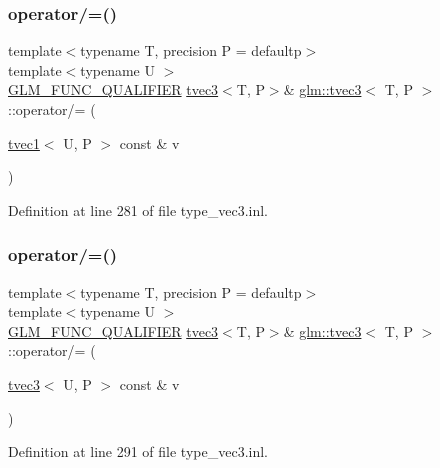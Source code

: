 \subsubsection{\texorpdfstring{operator/=()}{operator/=()}\hspace{0.1cm}{\footnotesize\ttfamily [5/6]}}
{\footnotesize\ttfamily template$<$typename T, precision P = defaultp$>$ \\
template$<$typename U $>$ \\
\mbox{\hyperlink{setup_8hpp_a33fdea6f91c5f834105f7415e2a64407}{G\+L\+M\+\_\+\+F\+U\+N\+C\+\_\+\+Q\+U\+A\+L\+I\+F\+I\+ER}} \mbox{\hyperlink{structglm_1_1tvec3}{tvec3}}$<$T, P$>$\& \mbox{\hyperlink{structglm_1_1tvec3}{glm\+::tvec3}}$<$ T, P $>$\+::operator/= (\begin{DoxyParamCaption}\item[{\mbox{\hyperlink{structglm_1_1tvec1}{tvec1}}$<$ U, P $>$ const \&}]{v }\end{DoxyParamCaption})}



Definition at line 281 of file type\+\_\+vec3.\+inl.

\mbox{\label{structglm_1_1tvec3_ad71db80da3ef78d0ac88533c9177ea77}} 
\subsubsection{\texorpdfstring{operator/=()}{operator/=()}\hspace{0.1cm}{\footnotesize\ttfamily [6/6]}}
{\footnotesize\ttfamily template$<$typename T, precision P = defaultp$>$ \\
template$<$typename U $>$ \\
\mbox{\hyperlink{setup_8hpp_a33fdea6f91c5f834105f7415e2a64407}{G\+L\+M\+\_\+\+F\+U\+N\+C\+\_\+\+Q\+U\+A\+L\+I\+F\+I\+ER}} \mbox{\hyperlink{structglm_1_1tvec3}{tvec3}}$<$T, P$>$\& \mbox{\hyperlink{structglm_1_1tvec3}{glm\+::tvec3}}$<$ T, P $>$\+::operator/= (\begin{DoxyParamCaption}\item[{\mbox{\hyperlink{structglm_1_1tvec3}{tvec3}}$<$ U, P $>$ const \&}]{v }\end{DoxyParamCaption})}



Definition at line 291 of file type\+\_\+vec3.\+inl.

